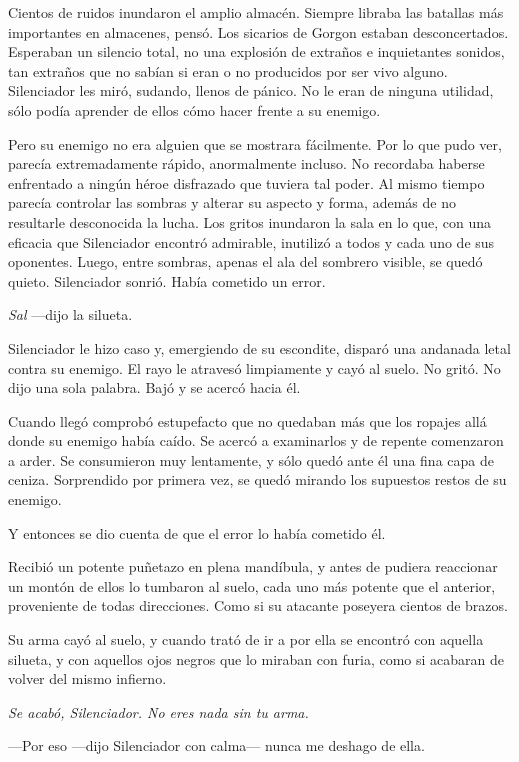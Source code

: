 Cientos de ruidos inundaron el amplio almacén. Siempre libraba las batallas más importantes en almacenes, pensó. Los sicarios de Gorgon estaban desconcertados. Esperaban un silencio total, no una explosión de extraños e inquietantes sonidos, tan extraños que no sabían si eran o no producidos por ser vivo alguno. Silenciador les miró, sudando, llenos de pánico. No le eran de ninguna utilidad, sólo podía aprender de ellos cómo hacer frente a su enemigo.

Pero su enemigo no era alguien que se mostrara fácilmente. Por lo que pudo ver, parecía extremadamente rápido, anormalmente incluso. No recordaba haberse enfrentado a ningún héroe disfrazado que tuviera tal poder. Al mismo tiempo parecía controlar las sombras y alterar su aspecto y forma, además de no resultarle desconocida la lucha. Los gritos inundaron la sala en lo que, con una eficacia que Silenciador encontró admirable, inutilizó a todos y cada uno de sus oponentes. Luego, entre sombras, apenas el ala del sombrero visible, se quedó quieto. Silenciador sonrió. Había cometido un error.

\emph{Sal} ---dijo la silueta.

Silenciador le hizo caso y, emergiendo de su escondite, disparó una andanada letal contra su enemigo. El rayo le atravesó limpiamente y cayó al suelo. No gritó. No dijo una sola palabra. Bajó y se acercó hacia él.

Cuando llegó comprobó estupefacto que no quedaban más que los ropajes allá donde su enemigo había caído. Se acercó a examinarlos y de repente comenzaron a arder. Se consumieron muy lentamente, y sólo quedó ante él una fina capa de ceniza. Sorprendido por primera vez, se quedó mirando los supuestos restos de su enemigo.

Y entonces se dio cuenta de que el error lo había cometido él.

Recibió un potente puñetazo en plena mandíbula, y antes de pudiera reaccionar un montón de ellos lo tumbaron al suelo, cada uno más potente que el anterior, proveniente de todas direcciones. Como si su atacante poseyera cientos de brazos.

Su arma cayó al suelo, y cuando trató de ir a por ella se encontró con aquella silueta, y con aquellos ojos negros que lo miraban con furia, como si acabaran de volver del mismo infierno.

\emph{Se acabó, Silenciador. No eres nada sin tu arma.}

---Por eso ---dijo Silenciador con calma--- nunca me deshago de ella.

